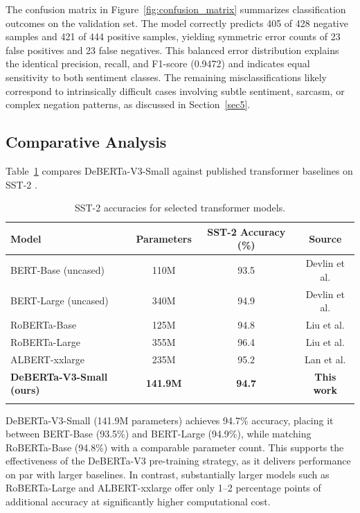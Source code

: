 \documentclass[pdflatex,sn-mathphys-num]{sn-jnl}
\theoremstyle{thmstyleone}%
\theoremstyle{thmstyletwo}%
\theoremstyle{thmstylethree}%
\begin{document}
The confusion matrix in Figure~\ref{fig:confusion_matrix} summarizes classification outcomes on the validation set. The model correctly predicts 405 of 428 negative samples and 421 of 444 positive samples, yielding symmetric error counts of 23 false positives and 23 false negatives. This balanced error distribution explains the identical precision, recall, and F1-score (0.9472) and indicates equal sensitivity to both sentiment classes. The remaining misclassifications likely correspond to intrinsically difficult cases involving subtle sentiment, sarcasm, or complex negation patterns, as discussed in Section~\ref{sec5}.


\subsection{Comparative Analysis}

Table~\ref{tab:comparison} compares DeBERTa-V3-Small against published transformer baselines on SST-2 \cite{devlin2019bert,liu2019roberta,lan2020albert}.

\begin{table}[h]
\centering
\begin{tabular}{@{}lccc@{}}
\toprule
\textbf{Model} & \textbf{Parameters} & \textbf{SST-2 Accuracy (\%)} & \textbf{Source} \\
\midrule
BERT-Base (uncased)   & 110M   & 93.5 & Devlin et al. \cite{devlin2019bert} \\
BERT-Large (uncased)  & 340M   & 94.9 & Devlin et al. \cite{devlin2019bert} \\
RoBERTa-Base          & 125M   & 94.8 & Liu et al. \cite{liu2019roberta} \\
RoBERTa-Large         & 355M   & 96.4 & Liu et al. \cite{liu2019roberta} \\
ALBERT-xxlarge        & 235M   & 95.2 & Lan et al. \cite{lan2020albert} \\
\midrule
\textbf{DeBERTa-V3-Small (ours)} & \textbf{141.9M} & \textbf{94.7} & \textbf{This work} \\
\botrule
\end{tabular}
\caption{SST-2 accuracies for selected transformer models.}
\label{tab:comparison}
\end{table}

DeBERTa-V3-Small (141.9M parameters) achieves 94.7\% accuracy, placing it between BERT-Base (93.5\%) and BERT-Large (94.9\%), while matching RoBERTa-Base (94.8\%) with a comparable parameter count. This supports the effectiveness of the DeBERTa-V3 pre-training strategy, as it delivers performance on par with larger baselines. In contrast, substantially larger models such as RoBERTa-Large and ALBERT-xxlarge offer only 1–2 percentage points of additional accuracy at significantly higher computational cost.
\end{document}
